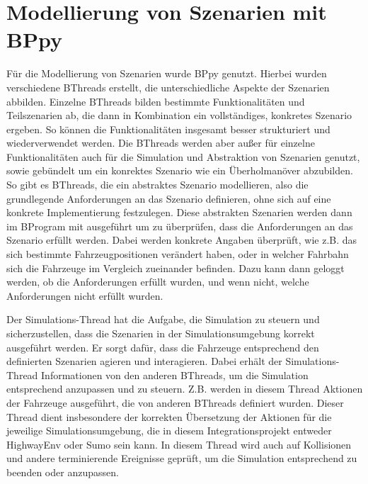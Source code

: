 \section{Modellierung von Szenarien mit BPpy}
Für die Modellierung von Szenarien wurde BPpy genutzt. Hierbei wurden verschiedene BThreads erstellt, die unterschiedliche Aspekte der Szenarien abbilden.
Einzelne BThreads bilden bestimmte Funktionalitäten und Teilszenarien ab, die dann in Kombination ein vollständiges, konkretes Szenario ergeben. So können die Funktionalitäten insgesamt besser strukturiert und wiederverwendet werden.
Die BThreads werden aber außer für einzelne Funktionalitäten auch für die Simulation und Abstraktion von Szenarien genutzt, sowie gebündelt um ein konrektes Szenario wie ein Überholmanöver abzubilden.
So gibt es BThreads, die ein abstraktes Szenario modellieren, also die grundlegende Anforderungen an das Szenario definieren, ohne sich auf eine konkrete Implementierung festzulegen. Diese abstrakten Szenarien werden dann im BProgram mit ausgeführt um zu überprüfen, dass die Anforderungen an das Szenario erfüllt werden.
Dabei werden konkrete Angaben überprüft, wie z.B. das sich bestimmte Fahrzeugpositionen verändert haben, oder in welcher Fahrbahn sich die Fahrzeuge im Vergleich zueinander befinden.
Dazu kann dann geloggt werden, ob die Anforderungen erfüllt wurden, und wenn nicht, welche Anforderungen nicht erfüllt wurden.

Der Simulations-Thread hat die Aufgabe, die Simulation zu steuern und sicherzustellen, dass die Szenarien in der Simulationsumgebung korrekt ausgeführt werden. Er sorgt dafür, dass die Fahrzeuge entsprechend den definierten Szenarien agieren und interagieren.
Dabei erhält der Simulations-Thread Informationen von den anderen BThreads, um die Simulation entsprechend anzupassen und zu steuern. Z.B. werden in diesem Thread Aktionen der Fahrzeuge ausgeführt, die von anderen BThreads definiert wurden.
Dieser Thread dient insbesondere der korrekten Übersetzung der Aktionen für die jeweilige Simulationsumgebung, die in diesem Integrationsprojekt entweder HighwayEnv oder Sumo sein kann.
In diesem Thread wird auch auf Kollisionen und andere terminierende Ereignisse geprüft, um die Simulation entsprechend zu beenden oder anzupassen.


